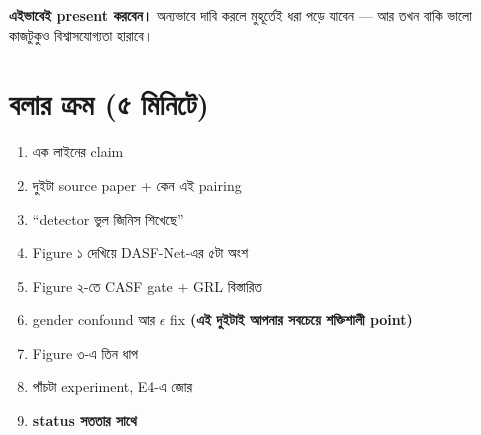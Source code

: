 \documentclass[11pt,a4paper]{article}
\begin{document}
\textbf{এইভাবেই present করবেন।} অন্যভাবে দাবি করলে মুহূর্তেই ধরা পড়ে যাবেন ---
আর তখন বাকি ভালো কাজটুকুও বিশ্বাসযোগ্যতা হারাবে।

\section*{বলার ক্রম (৫ মিনিটে)}

\begin{enumerate}
\item এক লাইনের claim
\item দুইটা source paper + কেন এই pairing
\item ``detector ভুল জিনিস শিখেছে''
\item Figure ১ দেখিয়ে DASF-Net-এর ৫টা অংশ
\item Figure ২-তে CASF gate + GRL বিস্তারিত
\item gender confound আর $\epsilon$ fix
      \textbf{(এই দুইটাই আপনার সবচেয়ে শক্তিশালী point)}
\item Figure ৩-এ তিন ধাপ
\item পাঁচটা experiment, E4-এ জোর
\item \textbf{status সততার সাথে}
\end{enumerate}
\end{document}
